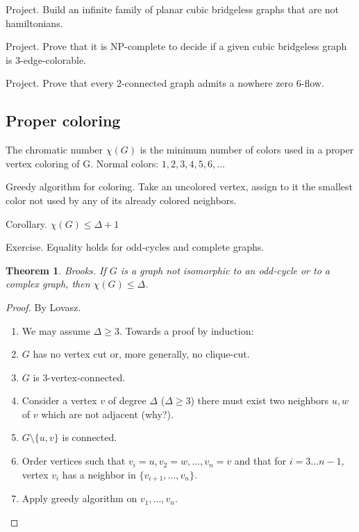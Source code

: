 \documentclass[12pt,a4paper]{article} \usepackage{fontspec}
\newtheorem{theorem}{Theorem} \newtheorem{definition}{Definition}
\begin{document}
Project. Build an infinite family of planar cubic bridgeless graphs that are not
hamiltonians.

Project. Prove that it is NP-complete to decide if a given cubic bridgeless
graph is 3-edge-colorable.

Project. Prove that every 2-connected graph admits a nowhere zero 6-flow.

\subsection{Proper coloring}

\begin{center} 
\end{center}

The chromatic number \(\chi(G)\) is the minimum number of colors used in a
proper vertex coloring of G. Normal colors: \(1, 2, 3, 4, 5, 6, \dots\)

Greedy algorithm for coloring.  Take an uncolored vertex, assign to it the
smallest color not used by any of its already colored neighbors.

Corollary. \(\chi(G) \leq \Delta + 1\)

Exercise. Equality holds for odd-cycles and complete graphs.

\begin{theorem} Brooks.  If \(G\) is a graph not isomorphic to an odd-cycle or
to a complex graph, then \(\chi(G) \leq \Delta\).  \end{theorem}

\begin{proof} By Lovasz.

  \begin{enumerate} \item We may assume \(\Delta \geq 3\). Towards a proof by
induction: \item \(G\) has no vertex cut or, more generally, no clique-cut.
\item \(G\) is \(3\)-vertex-connected.  \item Consider a vertex \(v\) of degree
\(\Delta\) (\(\Delta \geq 3\)) there must exist two neighbors \(u, w\) of \(v\)
which are not adjacent (why?).  \item \(G \setminus \{u, v\}\) is connected.
\item Order vertices such that \(v_i=u, v_2=w, \dots, v_n=v\) and that for \(i=3
\dots n-1\), vertex \(v_i\) has a neighbor in \(\{v_{i+1}, \dots, v_n\}\).
\item Apply greedy algorithm on \(v_1, \dots, v_n\).  \end{enumerate}
\end{proof}
\end{document}
